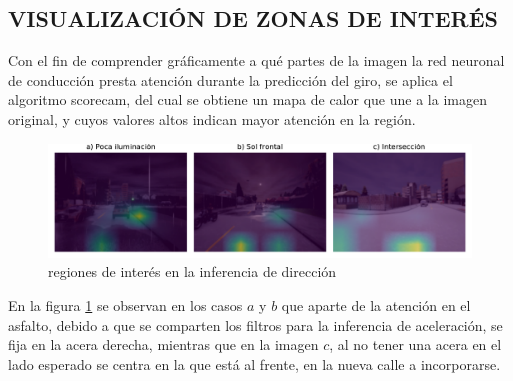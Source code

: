 \subsection{VISUALIZACIÓN DE ZONAS DE INTERÉS}
Con el fin de comprender gráficamente a qué partes de la imagen la red neuronal de conducción presta atención durante la predicción del giro, se aplica el algoritmo scorecam, del cual se obtiene un mapa de calor que une a la imagen original, y cuyos valores altos indican mayor atención en la región.

\begin{figure}[H]
	\centering
	\includegraphics[scale=0.6]{imagenes/preds/scorecam}
	\caption[Regiones de Interés en la Inferencia de Dirección]{regiones de interés en la inferencia de dirección}
	\label{scorecampred}
\end{figure}

En la figura \ref{scorecampred} se observan en los casos $a$ y $b$ que aparte de la atención en el asfalto, debido a que se comparten los filtros para la inferencia de aceleración, se fija en la acera derecha, mientras que en la imagen $c$, al no tener una acera en el lado esperado se centra en la que está al frente, en la nueva calle a incorporarse.